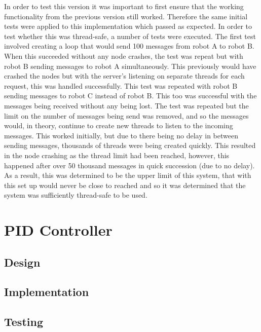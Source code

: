 In order to test this version it was important to first ensure that the
working functionality from the previous version still worked. Therefore
the same initial tests were applied to this implementation which passed
as expected. In order to test whether this was thread-safe, a number of
tests were executed. The first test involved creating a loop that would
send 100 messages from robot A to robot B. When this succeeded without any
node crashes, the test was repeat but with robot B sending messages to robot A
simultaneously. This previously would have crashed the nodes but with the
server's listening on separate threads for each request, this was handled
successfully. This test was repeated with robot B sending messages to robot C
instead of robot B. This too was successful with the messages being received
without any being lost. The test was repeated but the limit on the number of
messages being send was removed, and so the messages would, in theory,
continue to create new threads to listen to the incoming messages. This
worked initially, but due to there being no delay in between sending messages,
thousands of threads were being created quickly. This resulted in the node
crashing as the thread limit had been reached, however, this happened after
over 50 thousand messages in quick succession (due to no delay). As a result,
this was determined to be the upper limit of this system, that with this set
up would never be close to reached and so it was determined that the system
was sufficiently thread-safe to be used.

\section{PID Controller}\label{soft/PID}

\subsection{Design}\label{soft/PID/design}

\subsection{Implementation}\label{soft/PID/impl}

\subsection{Testing}\label{soft/PID/test}




